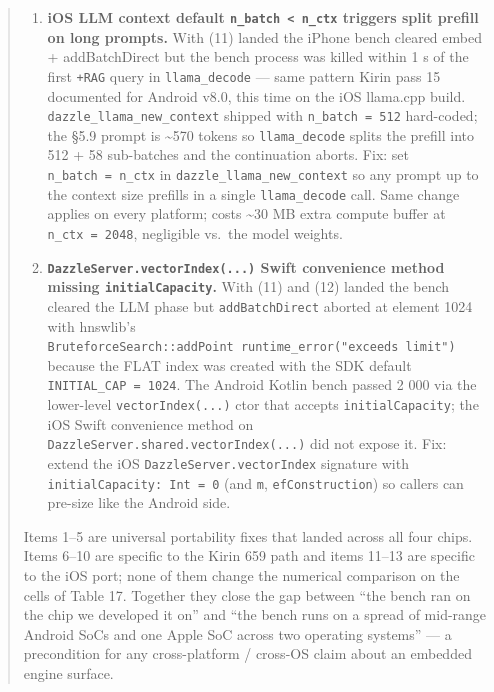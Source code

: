 \begin{quote}
\begin{enumerate}
  \texttt{0x8BADF00D\ ProcessVisibility:Foreground}. Fix: dispatch the bench on
  \texttt{DispatchQueue.global(qos:\ .userInitiated).async} from \texttt{init()}
  so SwiftUI's main runloop can schedule the placeholder body within the
  watchdog window. The bench then finishes \textasciitilde25--35 min later on
  the background queue and \texttt{exit(0)}s itself. Same fix lands as a public
  utility in the Swift \texttt{RagE2EBench.run()} so any iOS app using the entry
  point gets the dispatch automatically.
\item
  \textbf{iOS LLM context default \texttt{n\_batch\ \textless{}\ n\_ctx}
  triggers split prefill on long prompts.} With (11) landed the iPhone bench
  cleared embed + addBatchDirect but the bench process was killed within 1 s of
  the first \texttt{+RAG} query in \texttt{llama\_decode} --- same pattern Kirin
  pass 15 documented for Android v8.0, this time on the iOS llama.cpp build.
  \texttt{dazzle\_llama\_new\_context} shipped with \texttt{n\_batch\ =\ 512}
  hard-coded; the §5.9 prompt is \textasciitilde570 tokens so
  \texttt{llama\_decode} splits the prefill into 512 + 58 sub-batches and the
  continuation aborts. Fix: set \texttt{n\_batch\ =\ n\_ctx} in
  \texttt{dazzle\_llama\_new\_context} so any prompt up to the context size
  prefills in a single \texttt{llama\_decode} call. Same change applies on every
  platform; costs \textasciitilde30 MB extra compute buffer at
  \texttt{n\_ctx\ =\ 2048}, negligible vs.~the model weights.
\item
  \textbf{\texttt{DazzleServer.vectorIndex(...)} Swift convenience method
  missing \texttt{initialCapacity}.} With (11) and (12) landed the bench cleared
  the LLM phase but \texttt{addBatchDirect} aborted at element 1024 with
  hnswlib's
  \texttt{BruteforceSearch::addPoint\ runtime\_error("exceeds\ limit")} because
  the FLAT index was created with the SDK default
  \texttt{INITIAL\_CAP\ =\ 1024}. The Android Kotlin bench passed 2 000 via the
  lower-level \texttt{vectorIndex(...)} ctor that accepts
  \texttt{initialCapacity}; the iOS Swift convenience method on
  \texttt{DazzleServer.shared.vectorIndex(...)} did not expose it. Fix: extend
  the iOS \texttt{DazzleServer.vectorIndex} signature with
  \texttt{initialCapacity:\ Int\ =\ 0} (and \texttt{m}, \texttt{efConstruction})
  so callers can pre-size like the Android side.
\end{enumerate}

Items 1--5 are universal portability fixes that landed across all four chips.
Items 6--10 are specific to the Kirin 659 path and items 11--13 are specific to
the iOS port; none of them change the numerical comparison on the cells of Table
17. Together they close the gap between ``the bench ran on the chip we developed
it on'' and ``the bench runs on a spread of mid-range Android SoCs and one Apple
SoC across two operating systems'' --- a precondition for any cross-platform /
cross-OS claim about an embedded engine surface.
\end{quote}

